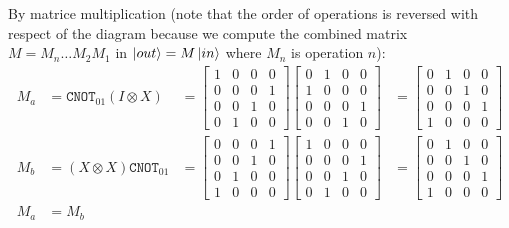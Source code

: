 \documentclass[12pt]{article}
\newcommand{\bmat}[1]{\begin{bmatrix}#1\end{bmatrix}}
\newenvironment{answer}{\begingroup\setlength{\leftskip}{-\leftmargin}\begin{framed}}{\end{framed}\endgroup}
\newcommand{\CNOT}[1]{\ensuremath{\texttt{CNOT}_{#1}}}
\begin{document}
\begin{enumerate}
\begin{answer}
        By matrice multiplication (note that the order of operations is reversed with respect of the diagram because we compute the combined matrix $M = M_n\dots{}M_2M_1$ in $\ket{out} = M\ket{in}$ where $M_n$ is operation $n$):
        \begin{align*}
            M_a &= \CNOT{01}(I \otimes X) &=
                \bmat{1&0&0&0\\0&0&0&1\\0&0&1&0\\0&1&0&0}
                \bmat{0&1&0&0\\1&0&0&0\\0&0&0&1\\0&0&1&0} &=
                \bmat{0&1&0&0\\0&0&1&0\\0&0&0&1\\1&0&0&0}\\
            M_b &= (X \otimes X)\CNOT{01} &=
                \bmat{0&0&0&1\\0&0&1&0\\0&1&0&0\\1&0&0&0}
                \bmat{1&0&0&0\\0&0&0&1\\0&0&1&0\\0&1&0&0} &=
                \bmat{0&1&0&0\\0&0&1&0\\0&0&0&1\\1&0&0&0}\\
            M_a &= M_b
        \end{align*}
    \end{answer}
\end{enumerate}
\end{document}
